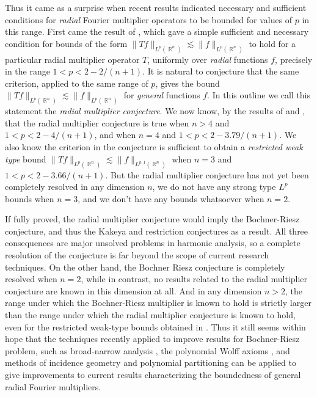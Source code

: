 \documentclass[12pt]{article}
\DeclareMathOperator{\RR}{\mathbb{R}}
\theoremstyle{plain}
\theoremstyle{remark}
\theoremstyle{definition}
\begin{document}
Thus it came as a surprise when recent results indicated necessary and sufficient conditions for \emph{radial} Fourier multiplier operators to be bounded for values of $p$ in this range. First came the result of \cite{GarrigosandSeeger}, which gave a simple sufficient and necessary condition for bounds of the form $\| Tf \|_{L^p(\RR^n)} \lesssim \| f \|_{L^p(\RR^n)}$ to hold for a particular radial multiplier operator $T$, uniformly over \emph{radial} functions $f$, precisely in the range $1 < p < 2 - 2/(n+1)$. It is natural to conjecture that the same criterion, applied to the same range of $p$, gives the bound $\| Tf \|_{L^p(\RR^n)} \lesssim \| f \|_{L^p(\RR^n)}$ for \emph{general} functions $f$. In this outline we call this statement the \emph{radial multiplier conjecture}. We now know, by the results of \cite{HeoandNazarovandSeeger} and \cite{Cladek}, that the radial multiplier conjecture is true when $n > 4$ and $1 < p < 2 - 4/(n+1)$, and when $n = 4$ and $1 < p < 2 - 3.79/(n+1)$. We also know \cite{Cladek} the criterion in the conjecture is sufficient to obtain a \emph{restricted weak type} bound $\| Tf \|_{L^p(\RR^n)} \lesssim \| f \|_{L^{p,1}(\RR^n)}$ when $n = 3$ and $1 < p < 2 - 3.66/(n+1)$. But the radial multiplier conjecture has not yet been completely resolved in any dimension $n$, we do not have any strong type $L^p$ bounds when $n = 3$, and we don't have any bounds whatsoever when $n = 2$.

If fully proved, the radial multiplier conjecture would imply the Bochner-Riesz conjecture, and thus the Kakeya and restriction conjectures as a result. All three consequences are major unsolved problems in harmonic analysis, so a complete resolution of the conjecture is far beyond the scope of current research techniques. On the other hand, the Bochner Riesz conjecture is completely resolved when $n = 2$, while in contrast, no results related to the radial multiplier conjecture are known in this dimension at all. And in any dimension $n > 2$, the range under which the Bochner-Riesz multiplier is known to hold \cite{GuoandOhandWangandWuandZhang} is strictly larger than the range under which the radial multiplier conjecture is known to hold, even for the restricted weak-type bounds obtained in \cite{Cladek}. Thus it still seems within hope that the techniques recently applied to improve results for Bochner-Riesz problem, such as broad-narrow analysis \cite{BourgainandGuth}, the polynomial Wolff axioms \cite{KatzandRogers}, and methods of incidence geometry and polynomial partitioning \cite{Zahl2} can be applied to give improvements to current results characterizing the boundedness of general radial Fourier multipliers.
\end{document}
